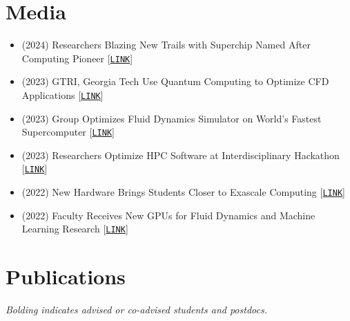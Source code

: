 \section{Media}

\begin{itemize}
    \item (2024) Researchers Blazing New Trails with Superchip Named After Computing Pioneer [\href{https://www.cc.gatech.edu/news/researchers-blazing-new-trails-superchip-named-after-computing-pioneer}{\tt LINK}] 

    \item (2023) GTRI, Georgia Tech Use Quantum Computing to Optimize CFD Applications
 [\href{https://gtri.gatech.edu/newsroom/gtri-georgia-tech-use-quantum-computing-optimize-cfd-applications}{\tt LINK}]

    \item (2023) Group Optimizes Fluid Dynamics Simulator on World's Fastest Supercomputer [\href{https://www.cc.gatech.edu/news/group-optimizes-fluid-dynamics-simulator-worlds-fastest-supercomputer}{\tt LINK}]

    \item (2023) Researchers Optimize HPC Software at Interdisciplinary Hackathon
[\href{https://www.cc.gatech.edu/news/researchers-optimize-hpc-software-interdisciplinary-hackathon}{\tt LINK}]

    \item (2022) New Hardware Brings Students Closer to Exascale Computing [\href{https://www.cc.gatech.edu/news/new-hardware-brings-students-closer-exascale-computing}{\tt LINK}]

    \item (2022) Faculty Receives New GPUs for Fluid Dynamics and Machine Learning Research [\href{https://www.cc.gatech.edu/news/faculty-receives-new-gpus-fluid-dynamics-and-machine-learning-research}{\tt LINK}]
\end{itemize}

\section{Publications}

\begin{center}
    \textit{Bolding indicates advised or co-advised students and postdocs.}
\end{center}

\nocite{*}

\newrefcontext[labelprefix=U]
\printbibliography[type=unpublished,title={Preprints},resetnumbers=true,heading=subbibnumbered]

